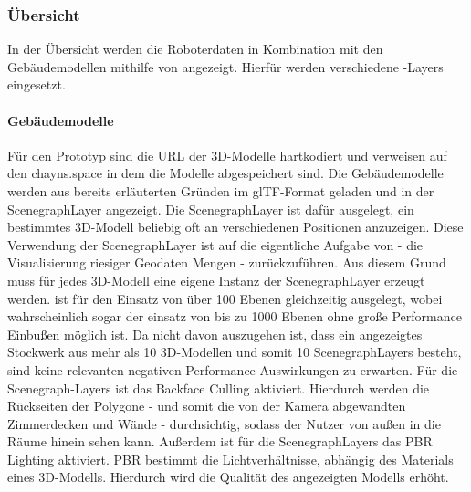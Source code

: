 \subsubsection{Übersicht}
In der Übersicht werden die Roboterdaten in Kombination mit den Gebäudemodellen mithilfe von \deckgl{} angezeigt. Hierfür werden verschiedene \deckgl{}-Layers eingesetzt.

\paragraph{Gebäudemodelle}
Für den Prototyp sind die \ac{URL} der 3D-Modelle hartkodiert und verweisen auf den chayns.space in dem die Modelle abgespeichert sind. Die Gebäudemodelle werden aus bereits erläuterten Gründen im \ac{glTF}-Format geladen und in der ScenegraphLayer angezeigt. Die ScenegraphLayer ist dafür ausgelegt, ein bestimmtes 3D-Modell beliebig oft an verschiedenen Positionen anzuzeigen. Diese Verwendung der ScenegraphLayer ist auf die eigentliche Aufgabe von \deckgl{} - die Visualisierung riesiger Geodaten Mengen - zurückzuführen. Aus diesem Grund muss für jedes 3D-Modell eine eigene Instanz der ScenegraphLayer erzeugt werden. 
\deckgl{} ist für den Einsatz von über 100 Ebenen gleichzeitig ausgelegt, wobei wahrscheinlich sogar der einsatz von bis zu 1000 Ebenen ohne große Performance Einbußen möglich ist. Da nicht davon auszugehen ist, dass ein angezeigtes Stockwerk aus mehr als 10 3D-Modellen und somit 10 ScenegraphLayers besteht, sind keine relevanten negativen Performance-Auswirkungen zu erwarten.
Für die Scenegraph-Layers ist das Backface Culling aktiviert. Hierdurch werden die Rückseiten der Polygone - und somit die von der Kamera abgewandten Zimmerdecken und Wände - durchsichtig, sodass der Nutzer von außen in die Räume hinein sehen kann. 
Außerdem ist für die ScenegraphLayers das \ac{PBR} Lighting aktiviert. \ac{PBR} bestimmt die Lichtverhältnisse, abhängig des Materials eines 3D-Modells. Hierdurch wird die Qualität des angezeigten Modells erhöht.

